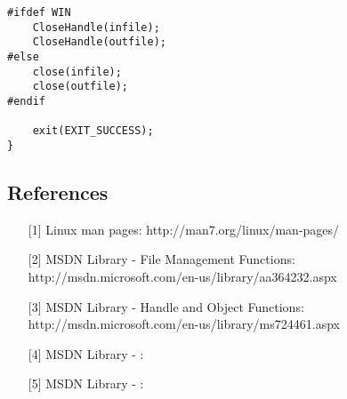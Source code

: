 \documentclass[letterpaper,10pt,fleqn]{article}
\numberwithin{equation}{section}
\begin{document}
\begin{verbatim}
#ifdef WIN
    CloseHandle(infile);
    CloseHandle(outfile);
#else
    close(infile);
    close(outfile);
#endif

    exit(EXIT_SUCCESS);
}
\end{verbatim}

\subsection*{References}

\begin{itemize}
    \item[{[}1{]}] Linux man pages: http://man7.org/linux/man-pages/
    \item[{[}2{]}] MSDN Library - File Management Functions: http://msdn.microsoft.com/en-us/library/aa364232.aspx
    \item[{[}3{]}] MSDN Library - Handle and Object Functions: http://msdn.microsoft.com/en-us/library/ms724461.aspx
    \item[{[}4{]}] MSDN Library - : 
    \item[{[}5{]}] MSDN Library - : 
\end{itemize}
\end{document}
